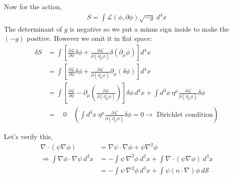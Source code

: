 \documentclass[14pt]{article} %
\begin{document}
Now for the action,
\begin{align*}
S = \int \mathcal{L}(\phi, \partial \phi) \sqrt{-g}~ d^4x
\end{align*}
The determinant of $g$ is negative so we put a minus sign inside to make the $(-g)$ positive. However we omit it in flat space:
\begin{align*}
\delta S &= \int \left[ \frac{\partial \mathcal{L}}{\partial \phi} \delta \phi + \frac{\partial \mathcal{L}}{\partial(\partial_\mu \phi)} \delta(\partial_\mu \phi) \right] d^4x \\
&= \int \left[ \frac{\partial \mathcal{L}}{\partial \phi} \delta \phi + \frac{\partial \mathcal{L}}{\partial(\partial_\mu \phi)} \partial_\mu(\delta \phi) \right] d^4x \\
&= \int \left[ \frac{\partial \mathcal{L}}{\partial \phi} - \partial_\mu \left( \frac{\partial \mathcal{L}}{\partial(\partial_\mu \phi)} \right) \right] \delta \phi \, d^4x 
+ \int d^3x~\eta^\mu \frac{\partial \mathcal{L}}{\partial(\partial_\mu \phi)} \delta \phi \\
&= \quad0 \quad\left( \int d^3x~\eta^\mu \frac{\partial \mathcal{L}}{\partial(\partial_\mu \phi)} \delta \phi = 0 \to \text{ Dirichlet condition} \right)
\end{align*}
\begin{tcolorbox}[ title=Verifying Dirichlet condition]
Let's verify this,
\begin{align*}
\nabla \cdot (\psi \nabla \phi) &= \nabla \psi \cdot \nabla \phi + \psi \nabla^2 \phi \\
\Rightarrow \int \nabla \phi \cdot \nabla \psi~d^3x &= -\int \psi \, \nabla^2 \phi~d^3 x +\int\nabla \cdot(\psi \nabla \phi)~ d^3 x \\
&=  -\int \psi \, \nabla^2 \phi~d^3 x +\int \psi (n\cdot\nabla) \phi~ d \mathcal{S}
\end{align*}
\end{tcolorbox}
\end{document}
